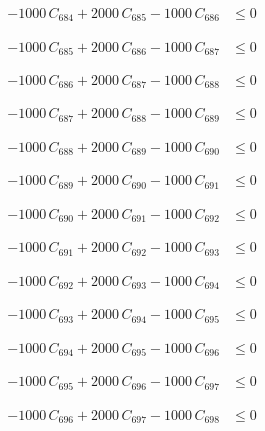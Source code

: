 \documentclass[a4paper,11pt]{article}
\begin{document}
\begin{align}
-1000\,C_{684} + 2000\,C_{685} - 1000\,C_{686} &\leq 0 \nonumber
\end{align}

\begin{align}
-1000\,C_{685} + 2000\,C_{686} - 1000\,C_{687} &\leq 0 \nonumber
\end{align}

\begin{align}
-1000\,C_{686} + 2000\,C_{687} - 1000\,C_{688} &\leq 0 \nonumber
\end{align}

\begin{align}
-1000\,C_{687} + 2000\,C_{688} - 1000\,C_{689} &\leq 0 \nonumber
\end{align}

\begin{align}
-1000\,C_{688} + 2000\,C_{689} - 1000\,C_{690} &\leq 0 \nonumber
\end{align}

\begin{align}
-1000\,C_{689} + 2000\,C_{690} - 1000\,C_{691} &\leq 0 \nonumber
\end{align}

\begin{align}
-1000\,C_{690} + 2000\,C_{691} - 1000\,C_{692} &\leq 0 \nonumber
\end{align}

\begin{align}
-1000\,C_{691} + 2000\,C_{692} - 1000\,C_{693} &\leq 0 \nonumber
\end{align}

\begin{align}
-1000\,C_{692} + 2000\,C_{693} - 1000\,C_{694} &\leq 0 \nonumber
\end{align}

\begin{align}
-1000\,C_{693} + 2000\,C_{694} - 1000\,C_{695} &\leq 0 \nonumber
\end{align}

\begin{align}
-1000\,C_{694} + 2000\,C_{695} - 1000\,C_{696} &\leq 0 \nonumber
\end{align}

\begin{align}
-1000\,C_{695} + 2000\,C_{696} - 1000\,C_{697} &\leq 0 \nonumber
\end{align}

\begin{align}
-1000\,C_{696} + 2000\,C_{697} - 1000\,C_{698} &\leq 0 \nonumber
\end{align}
\end{document}
